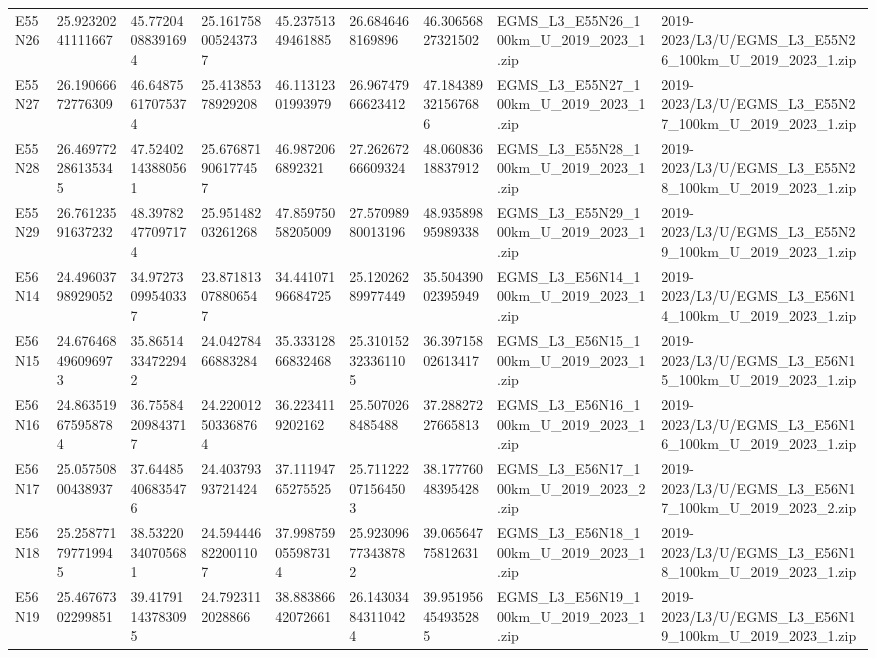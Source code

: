 \begin{landscape}
\begin{longtable}{lllllllll}
E55N26 & 25.92320241111667 & 45.77204088391694 & 25.161758005243737 & 45.23751349461885 & 26.6846468169896 & 46.30656827321502 & EGMS\_L3\_E55N26\_100km\_U\_2019\_2023\_1.zip & 2019-2023/L3/U/EGMS\_L3\_E55N26\_100km\_U\_2019\_2023\_1.zip \\
E55N27 & 26.19066672776309 & 46.64875617075374 & 25.41385378929208 & 46.11312301993979 & 26.96747966623412 & 47.184389321567686 & EGMS\_L3\_E55N27\_100km\_U\_2019\_2023\_1.zip & 2019-2023/L3/U/EGMS\_L3\_E55N27\_100km\_U\_2019\_2023\_1.zip \\
E55N28 & 26.469772286135345 & 47.52402143880561 & 25.676871906177457 & 46.9872066892321 & 27.26267266609324 & 48.06083618837912 & EGMS\_L3\_E55N28\_100km\_U\_2019\_2023\_1.zip & 2019-2023/L3/U/EGMS\_L3\_E55N28\_100km\_U\_2019\_2023\_1.zip \\
E55N29 & 26.76123591637232 & 48.39782477097174 & 25.95148203261268 & 47.85975058205009 & 27.57098980013196 & 48.93589895989338 & EGMS\_L3\_E55N29\_100km\_U\_2019\_2023\_1.zip & 2019-2023/L3/U/EGMS\_L3\_E55N29\_100km\_U\_2019\_2023\_1.zip \\
E56N14 & 24.49603798929052 & 34.97273099540337 & 23.871813078806547 & 34.44107196684725 & 25.12026289977449 & 35.50439002395949 & EGMS\_L3\_E56N14\_100km\_U\_2019\_2023\_1.zip & 2019-2023/L3/U/EGMS\_L3\_E56N14\_100km\_U\_2019\_2023\_1.zip \\
E56N15 & 24.676468496096973 & 35.86514334722942 & 24.04278466883284 & 35.33312866832468 & 25.310152323361105 & 36.39715802613417 & EGMS\_L3\_E56N15\_100km\_U\_2019\_2023\_1.zip & 2019-2023/L3/U/EGMS\_L3\_E56N15\_100km\_U\_2019\_2023\_1.zip \\
E56N16 & 24.863519675958784 & 36.75584209843717 & 24.220012503368764 & 36.2234119202162 & 25.5070268485488 & 37.28827227665813 & EGMS\_L3\_E56N16\_100km\_U\_2019\_2023\_1.zip & 2019-2023/L3/U/EGMS\_L3\_E56N16\_100km\_U\_2019\_2023\_1.zip \\
E56N17 & 25.05750800438937 & 37.64485406835476 & 24.40379393721424 & 37.11194765275525 & 25.711222071564503 & 38.17776048395428 & EGMS\_L3\_E56N17\_100km\_U\_2019\_2023\_2.zip & 2019-2023/L3/U/EGMS\_L3\_E56N17\_100km\_U\_2019\_2023\_2.zip \\
E56N18 & 25.258771797719945 & 38.53220340705681 & 24.594446822001107 & 37.998759055987314 & 25.923096773438782 & 39.06564775812631 & EGMS\_L3\_E56N18\_100km\_U\_2019\_2023\_1.zip & 2019-2023/L3/U/EGMS\_L3\_E56N18\_100km\_U\_2019\_2023\_1.zip \\
E56N19 & 25.46767302299851 & 39.41791143783095 & 24.7923112028866 & 38.88386642072661 & 26.143034843110424 & 39.951956454935285 & EGMS\_L3\_E56N19\_100km\_U\_2019\_2023\_1.zip & 2019-2023/L3/U/EGMS\_L3\_E56N19\_100km\_U\_2019\_2023\_1.zip \\

\end{longtable}
\end{landscape}
